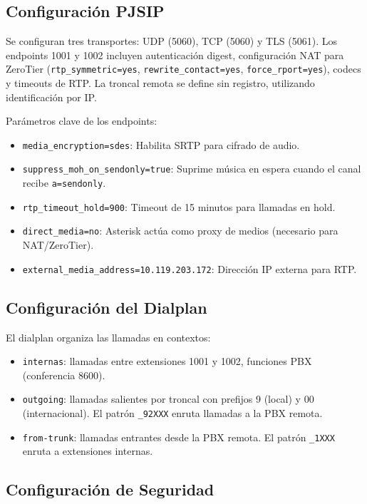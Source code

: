 \documentclass[12pt,a4paper]{article}
\begin{document}
\subsection{Configuración PJSIP}

Se configuran tres transportes: UDP (5060), TCP (5060) y TLS (5061). Los endpoints 1001 y 1002 incluyen autenticación digest, configuración NAT para ZeroTier (\texttt{rtp\_symmetric=yes}, \texttt{rewrite\_contact=yes}, \texttt{force\_rport=yes}), codecs y timeouts de RTP. La troncal remota se define sin registro, utilizando identificación por IP.

Parámetros clave de los endpoints:

\begin{itemize}
    \item \texttt{media\_encryption=sdes}: Habilita SRTP para cifrado de audio.
    \item \texttt{suppress\_moh\_on\_sendonly=true}: Suprime música en espera cuando el canal recibe \texttt{a=sendonly}.
    \item \texttt{rtp\_timeout\_hold=900}: Timeout de 15 minutos para llamadas en hold.
    \item \texttt{direct\_media=no}: Asterisk actúa como proxy de medios (necesario para NAT/ZeroTier).
    \item \texttt{external\_media\_address=10.119.203.172}: Dirección IP externa para RTP.
\end{itemize}

\subsection{Configuración del Dialplan}

El dialplan organiza las llamadas en contextos:
\begin{itemize}
    \item \texttt{internas}: llamadas entre extensiones 1001 y 1002, funciones PBX (conferencia 8600).
    \item \texttt{outgoing}: llamadas salientes por troncal con prefijos 9 (local) y 00 (internacional). El patrón \texttt{\_92XXX} enruta llamadas a la PBX remota.
    \item \texttt{from-trunk}: llamadas entrantes desde la PBX remota. El patrón \texttt{\_1XXX} enruta a extensiones internas.
\end{itemize}

\subsection{Configuración de Seguridad}
\end{document}
